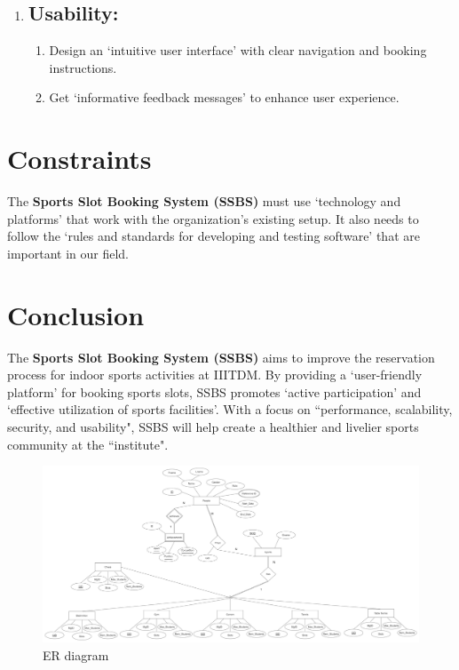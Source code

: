 \documentclass[12pt]{article}
\begin{document}
\begin{enumerate}[label=\arabic*.]
    \vspace{0.4cm}

    \newpage
    
    \item[] \subsection{Usability:}
    \begin{enumerate}[label=\alph*)]
        \item Design an `intuitive user interface' with clear navigation and booking instructions.
        \item Get `informative feedback messages' to enhance user experience.
    \end{enumerate}
   
\end{enumerate}



\section{Constraints}
\hspace{0.8cm} The \textbf{Sports Slot Booking System (SSBS)} must use `technology and platforms' that work with the organization's existing setup. It also needs to follow the `rules and standards for developing and testing software' that are important in our field.

\vspace{0.4cm}

\section{Conclusion}
\hspace{0.8cm} The \textbf{Sports Slot Booking System (SSBS)} aims to improve the reservation process for indoor sports activities at IIITDM. By providing a `user-friendly platform' for booking sports slots, SSBS promotes `active participation' and `effective utilization of sports facilities'. With a focus on ``performance, scalability, security, and usability", SSBS will help create a healthier and livelier sports community at the ``institute".

\newpage

\begin{itemize}
    \begin{figure}[h]
    \centering
    \includegraphics[width=1\linewidth]{ER4.jpg}
    \caption{ER diagram}
    \label{fig:enter-label}
    \end{figure}
\end{itemize}
\end{document}
